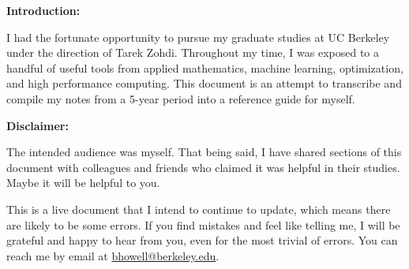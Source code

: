 \noindent
{\large \bf Introduction:}

I had the fortunate opportunity to pursue my graduate studies at UC Berkeley under the direction of Tarek Zohdi. Throughout my time, I was exposed to a handful of useful tools from applied mathematics, machine learning, optimization, and high performance computing. This document is an attempt to transcribe and compile my notes from a 5-year period into a reference guide for myself. 


\vspace{3em}

\noindent
{\large \bf Disclaimer:}

The intended audience was myself. That being said, I have shared sections of this document with colleagues and friends who claimed it was helpful in their studies. Maybe it will be helpful to you. 

This is a live document that I intend to continue to update, which means there are likely to be some errors. If you find mistakes and feel like telling me, I will be grateful and happy to hear from you, even for the most trivial of errors. You can reach me by email at \href{mailto:bhowell@berkeley.edu}{bhowell@berkeley.edu}.